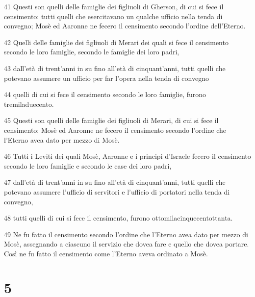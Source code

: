 \par 41 Questi son quelli delle famiglie dei figliuoli di Gherson, di cui si fece il censimento: tutti quelli che esercitavano un qualche ufficio nella tenda di convegno; Mosè ed Aaronne ne fecero il censimento secondo l'ordine dell'Eterno.
\par 42 Quelli delle famiglie dei figliuoli di Merari dei quali si fece il censimento secondo le loro famiglie, secondo le famiglie dei loro padri,
\par 43 dall'età di trent'anni in su fino all'età di cinquant'anni, tutti quelli che potevano assumere un ufficio per far l'opera nella tenda di convegno
\par 44 quelli di cui si fece il censimento secondo le loro famiglie, furono tremiladuecento.
\par 45 Questi son quelli delle famiglie dei figliuoli di Merari, di cui si fece il censimento; Mosè ed Aaronne ne fecero il censimento secondo l'ordine che l'Eterno avea dato per mezzo di Mosè.
\par 46 Tutti i Leviti dei quali Mosè, Aaronne e i principi d'Israele fecero il censimento secondo le loro famiglie e secondo le case dei loro padri,
\par 47 dall'età di trent'anni in su fino all'età di cinquant'anni, tutti quelli che potevano assumere l'ufficio di servitori e l'ufficio di portatori nella tenda di convegno,
\par 48 tutti quelli di cui si fece il censimento, furono ottomilacinquecentottanta.
\par 49 Ne fu fatto il censimento secondo l'ordine che l'Eterno avea dato per mezzo di Mosè, assegnando a ciascuno il servizio che dovea fare e quello che dovea portare. Così ne fu fatto il censimento come l'Eterno aveva ordinato a Mosè.

\chapter{5}

